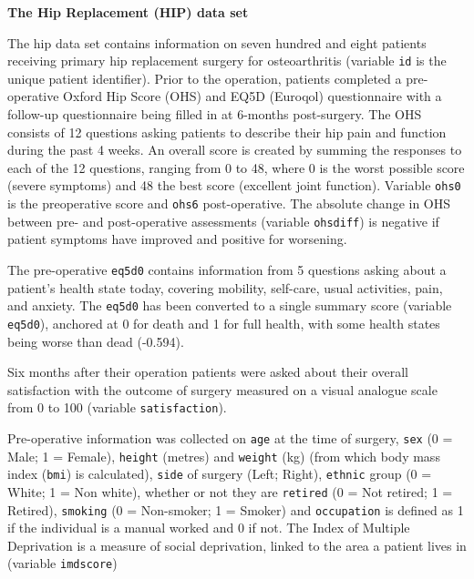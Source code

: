 \documentclass[
]{article}
\begin{document}
\textbf{The Hip Replacement (HIP) data set}

The hip data set contains information on seven hundred and eight
patients receiving primary hip replacement surgery for osteoarthritis
(variable \texttt{id} is the unique patient identifier). Prior to the
operation, patients completed a pre-operative Oxford Hip Score (OHS) and
EQ5D (Euroqol) questionnaire with a follow-up questionnaire being filled
in at 6-months post-surgery. The OHS consists of 12 questions asking
patients to describe their hip pain and function during the past 4
weeks. An overall score is created by summing the responses to each of
the 12 questions, ranging from 0 to 48, where 0 is the worst possible
score (severe symptoms) and 48 the best score (excellent joint
function). Variable \texttt{ohs0} is the preoperative score and
\texttt{ohs6} post-operative. The absolute change in OHS between pre-
and post-operative assessments (variable \texttt{ohsdiff}) is negative
if patient symptoms have improved and positive for worsening.

The pre-operative \texttt{eq5d0} contains information from 5 questions
asking about a patient's health state today, covering mobility,
self-care, usual activities, pain, and anxiety. The \texttt{eq5d0} has
been converted to a single summary score (variable \texttt{eq5d0}),
anchored at 0 for death and 1 for full health, with some health states
being worse than dead (-0.594).

Six months after their operation patients were asked about their overall
satisfaction with the outcome of surgery measured on a visual analogue
scale from 0 to 100 (variable \texttt{satisfaction}).

Pre-operative information was collected on \texttt{age} at the time of
surgery, \texttt{sex} (0 = Male; 1 = Female), \texttt{height} (metres)
and \texttt{weight} (kg) (from which body mass index (\texttt{bmi}) is
calculated), \texttt{side} of surgery (Left; Right), \texttt{ethnic}
group (0 = White; 1 = Non white), whether or not they are
\texttt{retired} (0 = Not retired; 1 = Retired), \texttt{smoking} (0 =
Non-smoker; 1 = Smoker) and \texttt{occupation} is defined as 1 if the
individual is a manual worked and 0 if not. The Index of Multiple
Deprivation is a measure of social deprivation, linked to the area a
patient lives in (variable \texttt{imdscore})
\end{document}
